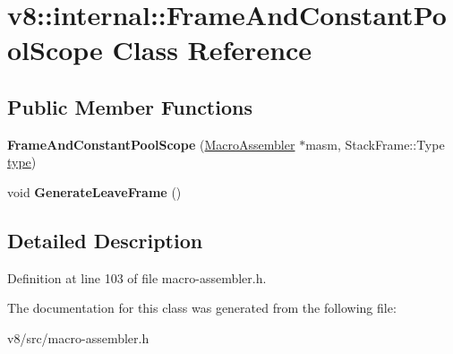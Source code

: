 \hypertarget{classv8_1_1internal_1_1FrameAndConstantPoolScope}{}\section{v8\+:\+:internal\+:\+:Frame\+And\+Constant\+Pool\+Scope Class Reference}
\label{classv8_1_1internal_1_1FrameAndConstantPoolScope}
\subsection*{Public Member Functions}
\begin{DoxyCompactItemize}
\item 
\mbox{\label{classv8_1_1internal_1_1FrameAndConstantPoolScope_afef3825495745c8b98c5b3381ce99060}} 
{\bfseries Frame\+And\+Constant\+Pool\+Scope} (\mbox{\hyperlink{classv8_1_1internal_1_1MacroAssembler}{Macro\+Assembler}} $\ast$masm, Stack\+Frame\+::\+Type \mbox{\hyperlink{classstd_1_1conditional_1_1type}{type}})
\item 
\mbox{\label{classv8_1_1internal_1_1FrameAndConstantPoolScope_a98536f48fb32f9f419b288db0e0ca1cd}} 
void {\bfseries Generate\+Leave\+Frame} ()
\end{DoxyCompactItemize}


\subsection{Detailed Description}


Definition at line 103 of file macro-\/assembler.\+h.



The documentation for this class was generated from the following file\+:\begin{DoxyCompactItemize}
\item 
v8/src/macro-\/assembler.\+h\end{DoxyCompactItemize}
